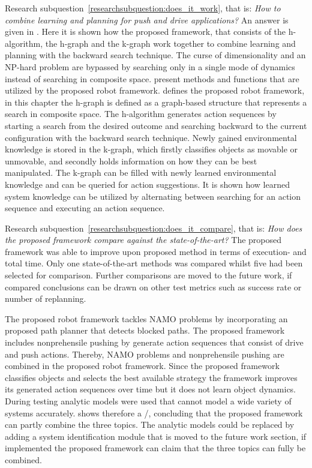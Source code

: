 Research subquestion~\ref{researchsubquestion:does_it_work}, that is: \textit{How to combine learning and planning for push and drive applications?} An answer is given in . Here it is shown how the proposed framework, that consists of the \acf{h-algorithm}, the \acf{h-graph} and the \acf{k-graph} work together to combine learning and planning with the backward search technique. The curse of dimensionality and an \ac{NP-hard} problem are bypassed by searching only in a single mode of dynamics instead of searching in composite space.  present methods and functions that are utilized by the proposed robot framework.  defines the proposed robot framework, in this chapter the \ac{h-graph} is defined as a graph-based structure that represents a search in composite space. The \ac{h-algorithm} generates action sequences by starting a search from the desired outcome and searching backward to the current configuration with the backward search technique. Newly gained environmental knowledge is stored in the \ac{k-graph}, which firstly classifies objects as movable or unmovable, and secondly holds information on how they can be best manipulated. The \ac{k-graph} can be filled with newly learned environmental knowledge and can be queried for action suggestions. It is shown how learned system knowledge can be utilized by alternating between searching for an action sequence and executing an action sequence.\bs

Research subquestion~\ref{researchsubquestion:does_it_compare}, that is: \textit{How does the proposed framework compare against the state-of-the-art?} The proposed framework was able to improve upon \citeauthor{wang_affordancebased_2020} proposed method in terms of execution- and total time. Only one state-of-the-art methods was compared whilst five had been selected for comparison. Further comparisons are moved to the future work, if compared conclusions can be drawn on other test metrics such as success rate or number of replanning.\bs

The proposed robot framework tackles \ac{NAMO} problems by incorporating an proposed path planner that detects blocked paths. The proposed framework includes nonprehensile pushing by generate action sequences that consist of drive and push actions. Thereby, \ac{NAMO} problems and nonprehensile pushing are combined in the proposed robot framework. Since the proposed framework classifies objects and selects the best available strategy the framework improves its generated action sequences over time but it does not learn object dynamics. During testing analytic models were used that cannot model a wide variety of systems accurately.  shows therefore a \xmark/\cmark, concluding that the proposed framework can partly combine the three topics. The analytic models could be replaced by adding a system identification module that is moved to the future work section, if implemented the proposed framework can claim that the three topics can fully be combined. 
